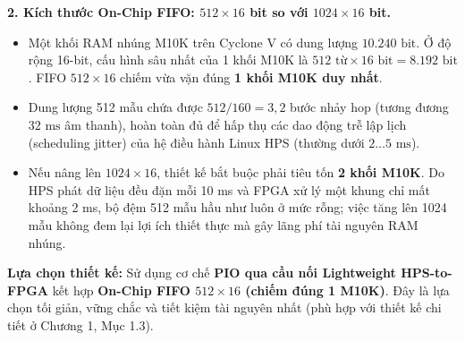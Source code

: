 \textbf{2. Kích thước On-Chip FIFO: $512 \times 16$ bit so với $1024 \times 16$ bit.}
\begin{itemize}[leftmargin=1.5em, itemsep=2pt]
    \item Một khối RAM nhúng M10K trên Cyclone V có dung lượng $10.240\text{ bit}$. Ở độ rộng 16-bit, cấu hình sâu nhất của 1 khối M10K là $512\text{ từ} \times 16\text{ bit} = 8.192\text{ bit}$. FIFO $512 \times 16$ chiếm vừa vặn đúng \textbf{1 khối M10K duy nhất}.
    \item Dung lượng 512 mẫu chứa được $512 / 160 = 3{,}2$ bước nhảy hop (tương đương $32\text{ ms}$ âm thanh), hoàn toàn đủ để hấp thụ các dao động trễ lập lịch (scheduling jitter) của hệ điều hành Linux HPS (thường dưới $2 \dots 5\text{ ms}$).
    \item Nếu nâng lên $1024 \times 16$, thiết kế bắt buộc phải tiêu tốn \textbf{2 khối M10K}. Do HPS phát dữ liệu đều đặn mỗi 10 ms và FPGA xử lý một khung chỉ mất khoảng 2 ms, bộ đệm 512 mẫu hầu như luôn ở mức rỗng; việc tăng lên 1024 mẫu không đem lại lợi ích thiết thực mà gây lãng phí tài nguyên RAM nhúng.
\end{itemize}

\textbf{Lựa chọn thiết kế:} Sử dụng cơ chế \textbf{PIO qua cầu nối Lightweight HPS-to-FPGA} kết hợp \textbf{On-Chip FIFO $512 \times 16$ (chiếm đúng 1 M10K)}. Đây là lựa chọn tối giản, vững chắc và tiết kiệm tài nguyên nhất (phù hợp với thiết kế chi tiết ở Chương 1, Mục 1.3).

